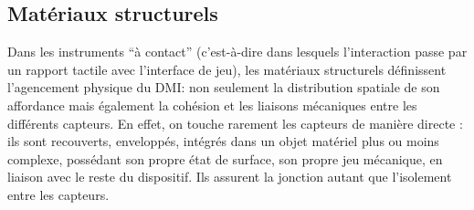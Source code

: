 \subsection{Matériaux structurels}

\noindent Dans les instruments ``à contact'' (c'est-à-dire dans lesquels l'interaction passe par un rapport tactile avec l'interface de jeu), les matériaux structurels définissent l'agencement physique du \gls{DMI}: non seulement la distribution spatiale de son affordance mais également la cohésion et les liaisons mécaniques entre les différents capteurs. En effet, on touche rarement les capteurs de manière directe : ils sont recouverts, enveloppés, intégrés dans un objet matériel plus ou moins complexe, possédant son propre état de surface, son propre jeu mécanique, en liaison avec le reste du dispositif. Ils assurent la jonction autant que l'isolement entre les capteurs.
\vspace{-1em}
